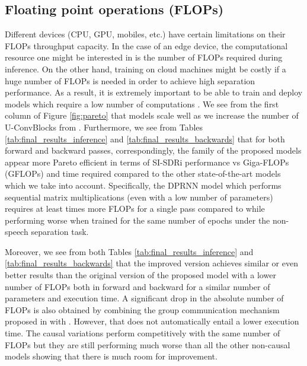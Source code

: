 \subsection{Floating point operations (FLOPs)}
\label{sec:results:FLOP}
Different devices (CPU, GPU, mobiles, etc.) have certain limitations on their FLOPs throughput capacity. In the case of an edge device, the computational resource one might be interested in is the number of FLOPs required during inference. On the other hand, training on cloud machines might be costly if a huge number of FLOPs is needed in order to achieve high separation performance. As a result, it is extremely important to be able to train and deploy models which require a low number of computations \cite{howard2017mobilenets}. We see from the first column of Figure \ref{fig:pareto} that \sudo models scale well as we increase the number of U-ConvBlocks  from . Furthermore, we see from Tables \ref{tab:final_results_inference} and \ref{tab:final_results_backwards} that for both forward and backward passes, correspondingly, the family of the proposed \sudo models appear more Pareto efficient in terms of SI-SDRi performance vs Giga-FLOPs (GFLOPs) and time required compared to the other state-of-the-art models which we take into account. Specifically, the DPRNN model \cite{luo2019dual} which performs sequential matrix multiplications (even with a low number of parameters) requires at least  times more FLOPs for a single pass compared to \sudos while performing worse when trained for the same number of epochs under the non-speech separation task.

Moreover, we see from both Tables \ref{tab:final_results_inference} and \ref{tab:final_results_backwards} that the improved version \sudoi achieves similar or even better results than the original version of the proposed model \sudo with a lower number of FLOPs both in forward and backward for a similar number of parameters and execution time. A significant drop in the absolute number of FLOPs is also obtained by combining the group communication mechanism proposed in \cite{luo2020groupcomm} with \sudoi. However, that does not automatically entail a lower execution time. The causal variations \csudoi perform competitively with the same number of FLOPs but they are still performing much worse than all the other non-causal models showing that there is much room for improvement.



